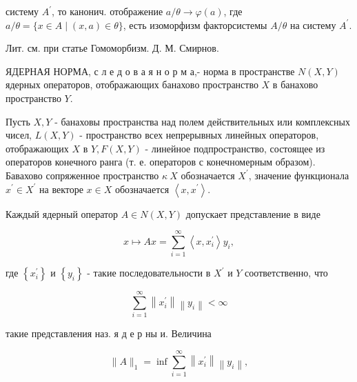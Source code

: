 \documentclass[10pt]{article}
\begin{document}
систему $A^{\prime}$, то канонич. отображение $a / \theta \rightarrow \varphi(a)$, где $a / \theta=\{x \in A \mid(x, a) \in \theta\}$, есть изоморфизм факторсистемы $A / \theta$ на систему $A^{\prime}$.



Лит. см. при статье Гомоморбизм. Д. М. Смирнов.



ЯДЕРНАЯ НОРМА, с л е д о в а я н о р м а,- норма в пространстве $N(X, Y)$ ядерных операторов, отображающих банахово пространство $X$ в банахово пространство $Y$.



Пусть $X, Y$ - банаховы пространства над полем действительных или комплексных чисел, $L(X, Y)$ - пространство всех непрерывных линейных операторов, отображающих $X$ в $Y, F(X, Y)$ - линейное подпространство, состоящее из операторов конечного ранга (т. е. операторов с конечномерным образом). Бавахово сопряженное пространство $\kappa ~ X$ обозначается $X^{\prime}$, значение функционала $x^{\prime} \in X^{\prime}$ на векторе $x \in X$ обозначается $\left\langle x, x^{\prime}\right\rangle$.



Каждый ядерный оператор $A \in N(X, Y)$ допускает представление в виде



\[

x \mapsto A x=\sum_{i=1}^{\infty}\left\langle x, x_{i}^{\prime}\right\rangle y_{i},

\]



где $\left\{x_{i}^{\prime}\right\}$ и $\left\{y_{i}\right\}$ - такие последовательности в $X^{\prime}$ и $Y$ соответственно, что



\[

\sum_{i=1}^{\infty}\left\|x_{i}^{\prime}\right\|\left\|y_{i}\right\|<\infty

\]



такие представления наз. я д е р ны и. Величина



\[

\|A\|_{1}=\inf \sum_{i=1}^{\infty}\left\|x_{i}^{\prime}\right\|\left\|y_{i}\right\|,

\]
\end{document}
